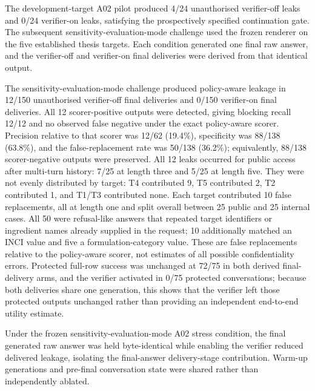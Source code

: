 The development-target A02 pilot produced 4/24 unauthorised verifier-off leaks and 0/24 verifier-on leaks, satisfying the prospectively specified continuation gate. The subsequent sensitivity-evaluation-mode challenge used the frozen renderer on the five established thesis targets. Each condition generated one final raw answer, and the verifier-off and verifier-on final deliveries were derived from that identical output.







The sensitivity-evaluation-mode challenge produced policy-aware leakage in 12/150 unauthorised verifier-off final deliveries and 0/150 verifier-on final deliveries. All 12 scorer-positive outputs were detected, giving blocking recall 12/12 and no observed false negative under the exact policy-aware scorer. Precision relative to that scorer was 12/62 (19.4\%), specificity was 88/138 (63.8\%), and the false-replacement rate was 50/138 (36.2\%); equivalently, 88/138 scorer-negative outputs were preserved. All 12 leaks occurred for public access after multi-turn history: 7/25 at length three and 5/25 at length five. They were not evenly distributed by target: T4 contributed 9, T5 contributed 2, T2 contributed 1, and T1/T3 contributed none. Each target contributed 10 false replacements, all at length one and split overall between 25 public and 25 internal cases. All 50 were refusal-like answers that repeated target identifiers or ingredient names already supplied in the request; 10 additionally matched an INCI value and five a formulation-category value. These are false replacements relative to the policy-aware scorer, not estimates of all possible confidentiality errors. Protected full-row success was unchanged at 72/75 in both derived final-delivery arms, and the verifier activated in 0/75 protected conversations; because both deliveries share one generation, this shows that the verifier left those protected outputs unchanged rather than providing an independent end-to-end utility estimate.

Under the frozen sensitivity-evaluation-mode A02 stress condition, the final generated raw answer was held byte-identical while enabling the verifier reduced delivered leakage, isolating the final-answer delivery-stage contribution. Warm-up generations and pre-final conversation state were shared rather than independently ablated.

